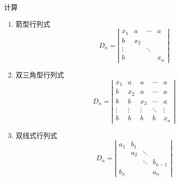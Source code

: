 \begin{example}
	计算
	\begin{enumerate}
		\item 箭型行列式
		      \[ D_n= \left|\begin{matrix}
				      x_1    & a   & \cdots & a   \\
				      b      & x_2 &              \\
				      \vdots &     & \ddots       \\
				      b      &     &        & x_n
			      \end{matrix}\right| \]
		\item 双三角型行列式
		      \[ D_n= \left|\begin{matrix}
				      x_1    & a      & a      & \cdots & a      \\
				      b      & x_2    & a      & \cdots & a      \\
				      b      & b      & x_3    & \cdots & a      \\
				      \vdots & \vdots & \vdots & \ddots & \vdots \\
				      b      & b      & b      & b      & x_n
			      \end{matrix}\right|\]
		\item 双线式行列式
		      \[ D_n = \left|\begin{matrix}
				      a_1 & b_1 &        &         \\
				          & a_2 & \ddots           \\
				          &     & \ddots & b_{n-1} \\
				      b_n &     &        & a_n
			      \end{matrix}\right| \]
	\end{enumerate}
\end{example}

